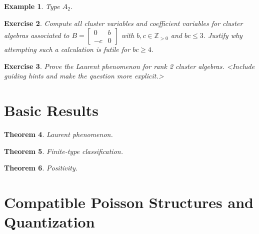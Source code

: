 \documentclass{amsart}
\newtheorem{theorem}{Theorem}[section]
\newtheorem{example}[theorem]{Example}
\newtheorem{exercise}[theorem]{Exercise}
\theoremstyle{remark}
\numberwithin{equation}{section}
\newcommand{\ZZ}{\mathbb{Z}}
\begin{document}
  \begin{example}
    Type $A_2$.
  \end{example}

  \begin{exercise}
    Compute all cluster variables and coefficient variables for cluster algebras associated to $B=\left[\begin{array}{cc} 0 & b\\ -c & 0\end{array}\right]$ with $b,c\in\ZZ_{>0}$ and $bc\le 3$.  Justify why attempting such a calculation is futile for $bc\ge4$.
  \end{exercise}

  \begin{exercise}
    Prove the Laurent phenomenon for rank 2 cluster algebras.  <Include guiding hints and make the question more explicit.>
  \end{exercise}

\section{Basic Results}

  \begin{theorem}
    Laurent phenomenon.
  \end{theorem}


  \begin{theorem}
    Finite-type classification.
  \end{theorem}

  \begin{theorem}
    Positivity.
  \end{theorem}


\section{Compatible Poisson Structures and Quantization}
\end{document}
